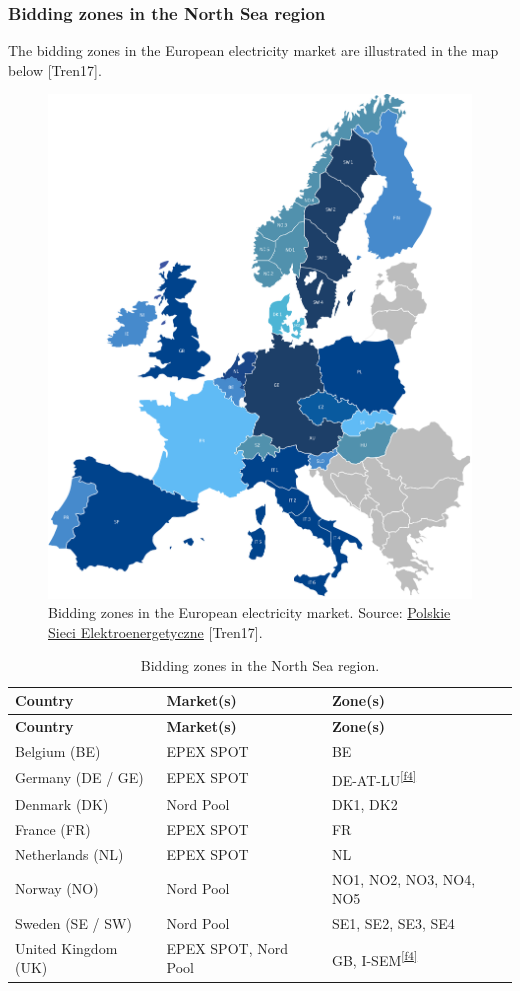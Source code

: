 \hypertarget{bidding-zones-in-the-north-sea-region}{%
\subsubsection{Bidding zones in the North Sea
region}\label{bidding-zones-in-the-north-sea-region}}

The bidding zones in the European electricity market are illustrated in
the map below {[}Tren17{]}.

\begin{figure}
\centering
\includegraphics{images/market-map.png}
\caption{Bidding zones in the European electricity market. Source:
\href{http://raport.pse.pl/en/trends-and-market-context}{Polskie Sieci
Elektroenergetyczne} {[}Tren17{]}.}
\end{figure}

\begin{longtable}[]{@{}lll@{}}
\caption{Bidding zones in the North Sea region.}\tabularnewline
\toprule
\textbf{Country} & \textbf{Market(s)} & \textbf{Zone(s)}\tabularnewline
\midrule
\endfirsthead
\toprule
\textbf{Country} & \textbf{Market(s)} & \textbf{Zone(s)}\tabularnewline
\midrule
\endhead
Belgium (BE) & EPEX SPOT & BE\tabularnewline
Germany (DE / GE) & EPEX SPOT &
DE-AT-LU\textsuperscript{\protect\hyperlink{f4}{{[}f4{]}}}\tabularnewline
Denmark (DK) & Nord Pool & DK1, DK2\tabularnewline
France (FR) & EPEX SPOT & FR\tabularnewline
Netherlands (NL) & EPEX SPOT & NL\tabularnewline
Norway (NO) & Nord Pool & NO1, NO2, NO3, NO4, NO5\tabularnewline
Sweden (SE / SW) & Nord Pool & SE1, SE2, SE3, SE4\tabularnewline
United Kingdom (UK) & EPEX SPOT, Nord Pool & GB,
I-SEM\textsuperscript{\protect\hyperlink{f4}{{[}f4{]}}}\tabularnewline
\bottomrule
\end{longtable}

